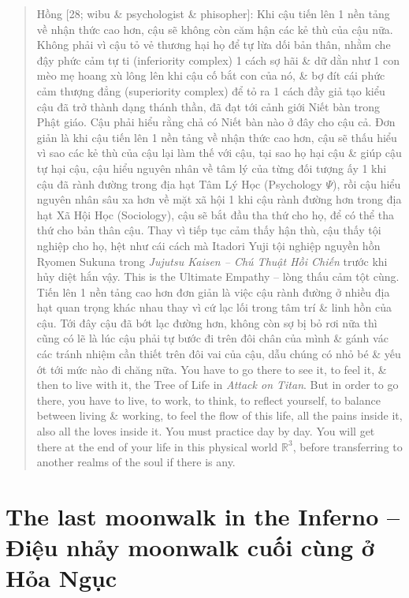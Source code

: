 \documentclass[12pt,oneside]{book}
\begin{document}
\begin{quote}
	{\sf Hồng [28; wibu \& psychologist \& phisopher]}: Khi cậu tiến lên 1 nền tảng về nhận thức cao hơn, cậu sẽ không còn căm hận các kẻ thù của cậu nữa. Không phải vì cậu tỏ vẻ thương hại họ để tự lừa dối bản thân, nhằm che đậy phức cảm tự ti (inferiority complex) 1 cách sợ hãi \& dữ dằn như 1 con mèo mẹ hoang xù lông lên khi cậu cố bắt con của nó, \& bợ đít cái phức cảm thượng đẳng (superiority complex) để tỏ ra 1 cách đầy giả tạo kiểu cậu đã trở thành dạng thánh thần, đã đạt tới cảnh giới Niết bàn trong Phật giáo. Cậu phải hiểu rằng chả có Niết bàn nào ở đây cho cậu cả. Đơn giản là khi cậu tiến lên 1 nền tảng về nhận thức cao hơn, cậu sẽ thấu hiểu vì sao các kẻ thù của cậu lại làm thế với cậu, tại sao họ hại cậu \& giúp cậu tự hại cậu, cậu hiểu nguyên nhân về tâm lý của từng đối tượng ấy 1 khi cậu đã rành đường trong địa hạt Tâm Lý Học (Psychology $\Psi$), rồi cậu hiểu nguyên nhân sâu xa hơn về mặt xã hội 1 khi cậu rành đường hơn trong địa hạt Xã Hội Học (Sociology), cậu sẽ bắt đầu tha thứ cho họ, để có thể tha thứ cho bản thân cậu. Thay vì tiếp tục cảm thấy hận thù, cậu thấy tội nghiệp cho họ, hệt như cái cách mà {\sf Itadori Yuji} tội nghiệp nguyền hồn {\sf Ryomen Sukuna} trong {\it Jujutsu Kaisen -- Chú Thuật Hồi Chiến} trước khi hủy diệt hắn vậy. This is the Ultimate Empathy -- lòng thấu cảm tột cùng. Tiến lên 1 nền tảng cao hơn đơn giản là việc cậu rành đường ở nhiều địa hạt quan trọng khác nhau thay vì cứ lạc lối trong tâm trí \& linh hồn của cậu. Tới đây cậu đã bớt lạc đường hơn, không còn sợ bị bỏ rơi nữa thì cũng có lẽ là lúc cậu phải tự bước đi trên đôi chân của mình \& gánh vác các tránh nhiệm cần thiết trên đôi vai của cậu, dẫu chúng có nhỏ bé \& yếu ớt tới mức nào đi chăng nữa. You have to go there to see it, to feel it, \& then to live with it, the Tree of Life in {\it Attack on Titan}. But in order to go there, you have to live, to work, to think, to reflect yourself, to balance between living \& working, to feel the flow of this life, all the pains inside it, also all the loves inside it. You must practice day by day. You will get there at the end of your life in this physical world $\mathbb{R}^3$, before transferring to another realms of the soul if there is any.
\end{quote}

\section{The last moonwalk in the Inferno -- Điệu nhảy moonwalk cuối cùng ở Hỏa Ngục}
\end{document}
